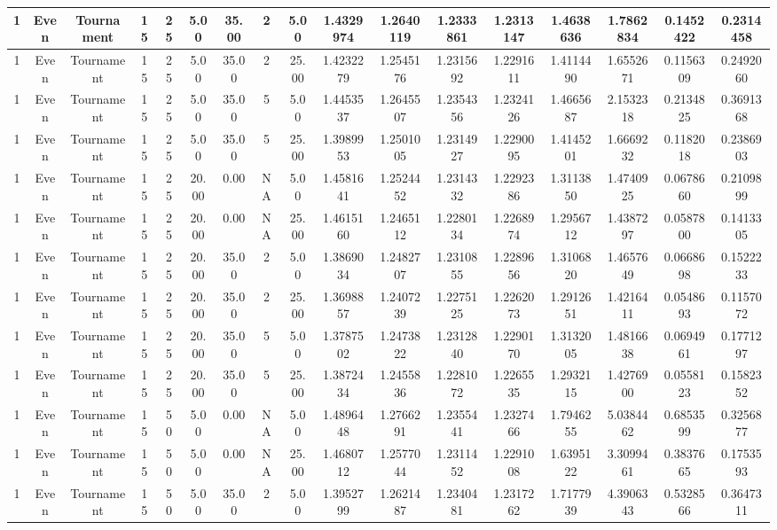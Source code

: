 \begin{longtable}{ | c | c | c | c | c | c | c | c | c | c | c | c | c | c | c | c | c | }
	\hline
	1	&	Even	&	Tournament	&	15	&	25	&	5.00	&	35.00	&	2	&	5.00	&	1.4329974	&	1.2640119	&	1.2333861	&	1.2313147	&	1.4638636	&	1.7862834	&	0.1452422	&	0.2314458 \\
	\hline
	1	&	Even	&	Tournament	&	15	&	25	&	5.00	&	35.00	&	2	&	25.00	&	1.4232279	&	1.2545176	&	1.2315692	&	1.2291611	&	1.4114490	&	1.6552671	&	0.1156309	&	0.2492060 \\
	\hline
	1	&	Even	&	Tournament	&	15	&	25	&	5.00	&	35.00	&	5	&	5.00	&	1.4453537	&	1.2645507	&	1.2354356	&	1.2324126	&	1.4665687	&	2.1532318	&	0.2134825	&	0.3691368 \\
	\hline
	1	&	Even	&	Tournament	&	15	&	25	&	5.00	&	35.00	&	5	&	25.00	&	1.3989953	&	1.2501005	&	1.2314927	&	1.2290095	&	1.4145201	&	1.6669232	&	0.1182018	&	0.2386903 \\
	\hline
	1	&	Even	&	Tournament	&	15	&	25	&	20.00	&	0.00	&	NA	&	5.00	&	1.4581641	&	1.2524452	&	1.2314332	&	1.2292386	&	1.3113850	&	1.4740925	&	0.0678660	&	0.2109899 \\
	\hline
	1	&	Even	&	Tournament	&	15	&	25	&	20.00	&	0.00	&	NA	&	25.00	&	1.4615160	&	1.2465112	&	1.2280134	&	1.2268974	&	1.2956712	&	1.4387297	&	0.0587800	&	0.1413305 \\
	\hline
	1	&	Even	&	Tournament	&	15	&	25	&	20.00	&	35.00	&	2	&	5.00	&	1.3869034	&	1.2482707	&	1.2310855	&	1.2289656	&	1.3106820	&	1.4657649	&	0.0668698	&	0.1522233 \\
	\hline
	1	&	Even	&	Tournament	&	15	&	25	&	20.00	&	35.00	&	2	&	25.00	&	1.3698857	&	1.2407239	&	1.2275125	&	1.2262073	&	1.2912651	&	1.4216411	&	0.0548693	&	0.1157072 \\
	\hline
	1	&	Even	&	Tournament	&	15	&	25	&	20.00	&	35.00	&	5	&	5.00	&	1.3787502	&	1.2473822	&	1.2312840	&	1.2290170	&	1.3132005	&	1.4816638	&	0.0694961	&	0.1771297 \\
	\hline
	1	&	Even	&	Tournament	&	15	&	25	&	20.00	&	35.00	&	5	&	25.00	&	1.3872434	&	1.2455836	&	1.2281072	&	1.2265535	&	1.2932115	&	1.4276900	&	0.0558123	&	0.1582352 \\
	\hline
	1	&	Even	&	Tournament	&	15	&	50	&	5.00	&	0.00	&	NA	&	5.00	&	1.4896448	&	1.2766291	&	1.2355441	&	1.2327466	&	1.7946255	&	5.0384462	&	0.6853599	&	0.3256877 \\
	\hline
	1	&	Even	&	Tournament	&	15	&	50	&	5.00	&	0.00	&	NA	&	25.00	&	1.4680712	&	1.2577044	&	1.2311452	&	1.2291008	&	1.6395122	&	3.3099461	&	0.3837665	&	0.1753593 \\
	\hline
	1	&	Even	&	Tournament	&	15	&	50	&	5.00	&	35.00	&	2	&	5.00	&	1.3952799	&	1.2621487	&	1.2340481	&	1.2317262	&	1.7177939	&	4.3906343	&	0.5328566	&	0.3647311 \\

\end{longtable}
